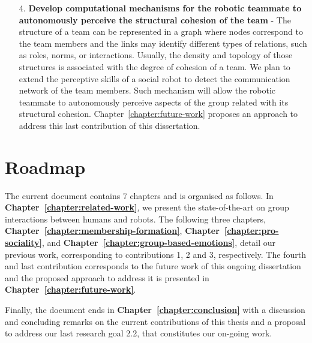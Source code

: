 \begin{itemize}
    \item[4.] \textbf{Develop computational mechanisms for the robotic teammate to autonomously perceive the structural cohesion of the team} - The structure of a team can be represented in a graph where nodes correspond to the team members and the links may identify different types of relations, such as roles, norms, or interactions. Usually, the density and topology of those structures is associated with the degree of cohesion of a team. We plan to extend the perceptive skills of a social robot to detect the communication network of the team members. Such mechanism will allow the robotic teammate to autonomously perceive aspects of the group related with its structural cohesion. Chapter~\ref{chapter:future-work} proposes an approach to address this last contribution of this dissertation.
\end{itemize}



\section{Roadmap}
The current document contains 7 chapters and is organised as follows. %
In \textbf{Chapter~\ref{chapter:related-work}}, we present the state-of-the-art on group interactions between humans and robots. The following three chapters, \textbf{Chapter~\ref{chapter:membership-formation}}, \textbf{Chapter~\ref{chapter:pro-sociality}}, and \textbf{Chapter~\ref{chapter:group-based-emotions}}, detail our previous work, corresponding to contributions 1, 2 and 3, respectively. The fourth and last contribution corresponds to the future work of this ongoing dissertation and the proposed approach to address it is presented in \textbf{Chapter~\ref{chapter:future-work}}.

Finally, the document ends in \textbf{Chapter~\ref{chapter:conclusion}} with a discussion and concluding remarks on the current contributions of this thesis and a proposal to address our last research goal 2.2, that constitutes our on-going work.
